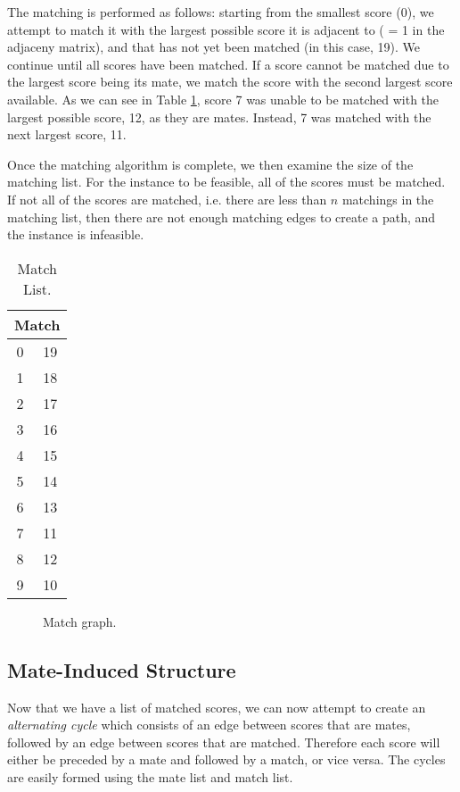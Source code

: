 \documentclass[a4paper, 11pt, twoside, onecolumn, openany]{article}
\begin{document}
The matching is performed as follows: starting from the smallest score (0), we attempt to match it with the largest possible score it is adjacent to ( = 1 in the adjaceny matrix), and that has not yet been matched (in this case, 19). We continue until all scores have been matched. If a score cannot be matched due to the largest score being its mate, we match the score with the second largest score available. As we can see in Table \ref{table:match}, score 7 was unable to be matched with the largest possible score, 12, as they are mates. Instead, 7 was matched with the next largest score, 11.

Once the matching algorithm is complete, we then examine the size of the matching list. For the instance to be feasible, all of the scores must be matched. If not all of the scores are matched, i.e. there are less than $n$ matchings in the matching list, then there are not enough matching edges to create a path, and the instance is infeasible. 

\begin{table}[!htb]
	\centering
	\begin{tabular}{|c|c|}
		\hline
		\multicolumn{2}{|c|}{Match}\\ \hline
		0 & 19 \\ \hline
		1 & 18 \\ \hline
		2 & 17 \\ \hline
		3 & 16 \\ \hline
		4 & 15 \\ \hline
		5 & 14 \\ \hline
		6 & 13 \\ \hline
		7 & 11 \\ \hline
		8 & 12 \\ \hline
		9 & 10 \\
		\hline
	\end{tabular}
	\caption{Match List.}
	\label{table:match}
\end{table}	

\begin{figure}[!htb]
	\centering
	
	\caption{Match graph.}
	\label{fig:match}	
\end{figure}

\subsection{Mate-Induced Structure}
Now that we have a list of matched scores, we can now attempt to create an \textit{alternating cycle} which consists of an edge between scores that are mates, followed by an edge between scores that are matched. Therefore each score will either be preceded by a mate and followed by a match, or vice versa. The cycles are easily formed using the mate list and match list. 
\end{document}
